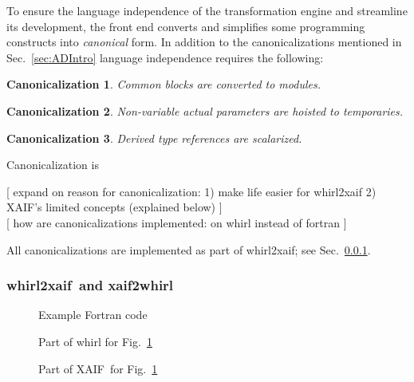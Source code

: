 \documentclass[11pt]{article}
\newcommand{\xaif}{XAIF}
\newcommand{\whirlToxaif}{whirl2xaif}
\newcommand{\xaifTowhirl}{xaif2whirl}
\newcommand{\refsec}[1]{{Sec.~\ref{#1}}}
\newcommand{\reffig}[1]{{Fig.~\ref{#1}}}
\newtheorem{Can}{Canonicalization}
\begin{document}
To ensure the language independence of the transformation engine and
streamline its development, the front end converts and simplifies some
programming constructs into \emph{canonical} form.  In addition to the
canonicalizations mentioned in \refsec{sec:ADIntro} language
independence requires the following:

\begin{Can}\label{can:comBlock}
  Common blocks are converted to modules.
\end{Can}
\begin{Can}\label{can:param}
  Non-variable actual parameters are hoisted to temporaries.
\end{Can}
\begin{Can}\label{can:scalar}
  Derived type references are scalarized.
\end{Can}	


{\color{red}
  Canonicalization is 

  [ expand on reason for canonicalization: 
  1) make life easier for whirl2xaif
  2) XAIF's limited concepts (explained below) 
  ] \\

  [ how are canonicalizations implemented: on whirl instead of fortran ] \\

}

All canonicalizations are implemented as part of \whirlToxaif; see 
\refsec{sssec:wtxxtw}.

\subsubsection{\whirlToxaif\ and \xaifTowhirl}\label{sssec:wtxxtw}

\begin{figure}
  \scriptsize
  \caption{Example Fortran code}\label{fig:exampleFortranCode}
\end{figure}

\begin{figure}
  \scriptsize
  \caption{Part of whirl for \reffig{fig:exampleFortranCode}}\label{fig:exampleWhirlCode}
\end{figure}

\begin{figure}
  \scriptsize
  \caption{Part of \xaif\ for \reffig{fig:exampleFortranCode}}\label{fig:exampleXaifCode}
\end{figure}
\end{document}
